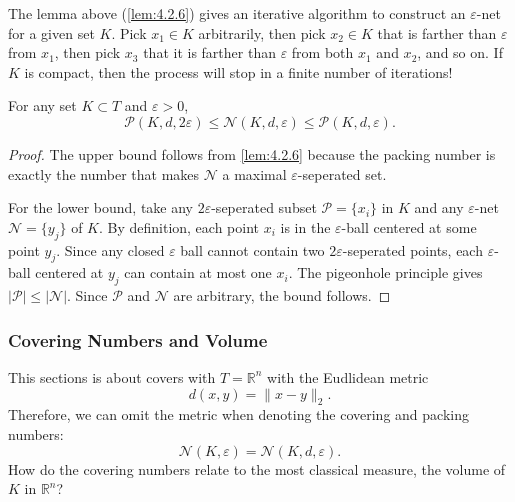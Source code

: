 \begin{remark}
\label{rmk:4.2.7}
The lemma above (\cref{lem:4.2.6}) gives an iterative algorithm to construct an $\varepsilon$-net for a 
given set $K$. Pick $x_1 \in K$ arbitrarily, then pick $x_2 \in K$ that is farther than $\varepsilon$ from 
$x_1$, then pick $x_3$ that it is farther than $\varepsilon$ from both $x_1$ and $x_2$, and so on. If $K$ 
is compact, then the process will stop in a finite number of iterations!
\end{remark}

\begin{lemma}
\label{lem:4.2.8}
For any set $K \subset T$ and $\varepsilon > 0$, 
\[ \mathcal{P}(K, d, 2 \varepsilon) \leq \mathcal{N}(K, d, \varepsilon) 
\leq \mathcal{P}(K, d, \varepsilon). \]
\end{lemma}

\begin{proof}
The upper bound follows from \cref{lem:4.2.6} because the packing number is exactly the number that makes 
$\mathcal{N}$ a maximal $\varepsilon$-seperated set.

For the lower bound, take any $2 \varepsilon$-seperated subset $\mathcal{P} = \{x_i\}$ in $K$ and any 
$\varepsilon$-net $\mathcal{N} = \{y_j\}$ of $K$. By definition, each point $x_i$ is in the $\varepsilon$-ball 
centered at some point $y_j$. Since any closed $\varepsilon$ ball cannot contain two $2 \varepsilon$-seperated 
points, each $\varepsilon$-ball centered at $y_j$ can contain at most one $x_i$. The pigeonhole principle 
gives $|\mathcal{P}| \leq |\mathcal{N}|$. Since $\mathcal{P}$ and $\mathcal{N}$ are arbitrary, the bound follows.
\end{proof}

\subsubsection{Covering Numbers and Volume}
This sections is about covers with $T = \mathbb{R}^n$ with the Eudlidean metric 
\[ d(x, y) = \lVert x - y \rVert_{2}. \]
Therefore, we can omit the metric when denoting the covering and packing numbers: 
\[ \mathcal{N}(K, \varepsilon) = \mathcal{N}(K, d, \varepsilon). \]
How do the covering numbers relate to the most classical measure, the volume of $K$ in $\mathbb{R}^n$? 

